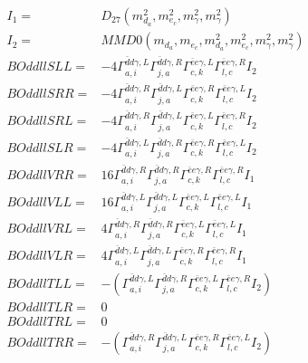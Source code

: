 \documentclass[A4,landscape]{article}
\begin{document}
\begin{align} 
I_1 = & D_{27}(m^2_{d_{{a}}}, m^2_{e_{{c}}}, m^2_{\gamma}, m^2_{\gamma}) \\ 
I_2 = & MMD0(m_{d_{{a}}}, m_{e_{{c}}}, m^2_{d_{{a}}}, m^2_{e_{{c}}}, m^2_{\gamma}, m^2_{\gamma}) \\ 
  BOddllSLL= & -4  \Gamma^{\bar{d}d \gamma ,L}_{a, i} \Gamma^{\bar{d}d \gamma ,R}_{j, a} \Gamma^{\bar{e}e \gamma ,L}_{c, k} \Gamma^{\bar{e}e \gamma ,R}_{l, c} I_2 \\ 
  BOddllSRR= & -4  \Gamma^{\bar{d}d \gamma ,R}_{a, i} \Gamma^{\bar{d}d \gamma ,L}_{j, a} \Gamma^{\bar{e}e \gamma ,R}_{c, k} \Gamma^{\bar{e}e \gamma ,L}_{l, c} I_2 \\ 
  BOddllSRL= & -4  \Gamma^{\bar{d}d \gamma ,R}_{a, i} \Gamma^{\bar{d}d \gamma ,L}_{j, a} \Gamma^{\bar{e}e \gamma ,L}_{c, k} \Gamma^{\bar{e}e \gamma ,R}_{l, c} I_2 \\ 
  BOddllSLR= & -4  \Gamma^{\bar{d}d \gamma ,L}_{a, i} \Gamma^{\bar{d}d \gamma ,R}_{j, a} \Gamma^{\bar{e}e \gamma ,R}_{c, k} \Gamma^{\bar{e}e \gamma ,L}_{l, c} I_2 \\ 
  BOddllVRR= & 16  \Gamma^{\bar{d}d \gamma ,R}_{a, i} \Gamma^{\bar{d}d \gamma ,R}_{j, a} \Gamma^{\bar{e}e \gamma ,R}_{c, k} \Gamma^{\bar{e}e \gamma ,R}_{l, c} I_1 \\ 
  BOddllVLL= & 16  \Gamma^{\bar{d}d \gamma ,L}_{a, i} \Gamma^{\bar{d}d \gamma ,L}_{j, a} \Gamma^{\bar{e}e \gamma ,L}_{c, k} \Gamma^{\bar{e}e \gamma ,L}_{l, c} I_1 \\ 
  BOddllVRL= & 4  \Gamma^{\bar{d}d \gamma ,R}_{a, i} \Gamma^{\bar{d}d \gamma ,R}_{j, a} \Gamma^{\bar{e}e \gamma ,L}_{c, k} \Gamma^{\bar{e}e \gamma ,L}_{l, c} I_1 \\ 
  BOddllVLR= & 4  \Gamma^{\bar{d}d \gamma ,L}_{a, i} \Gamma^{\bar{d}d \gamma ,L}_{j, a} \Gamma^{\bar{e}e \gamma ,R}_{c, k} \Gamma^{\bar{e}e \gamma ,R}_{l, c} I_1 \\ 
  BOddllTLL= & -( \Gamma^{\bar{d}d \gamma ,L}_{a, i} \Gamma^{\bar{d}d \gamma ,R}_{j, a} \Gamma^{\bar{e}e \gamma ,L}_{c, k} \Gamma^{\bar{e}e \gamma ,R}_{l, c} I_2) \\ 
  BOddllTLR= & 0 \\ 
  BOddllTRL= & 0 \\ 
  BOddllTRR= & -( \Gamma^{\bar{d}d \gamma ,R}_{a, i} \Gamma^{\bar{d}d \gamma ,L}_{j, a} \Gamma^{\bar{e}e \gamma ,R}_{c, k} \Gamma^{\bar{e}e \gamma ,L}_{l, c} I_2) \\ 
\end{align} 
\end{document}
